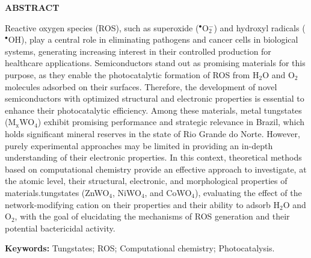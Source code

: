 \ifincluirabstract
\clearpage
\begin{center}
  \fontsize{14}{16}\selectfont\textbf{ABSTRACT}
\end{center}
  \begin{text}
  \noindent Reactive oxygen species (ROS), such as superoxide ($^{\bullet}$O$_2^{-}$) and hydroxyl radicals ($^{\bullet}$OH), play a central role in eliminating pathogens and cancer cells in biological systems, generating increasing interest in their controlled production for healthcare applications. Semiconductors stand out as promising materials for this purpose, as they enable the photocatalytic formation of ROS from H$_{\text{2}}$O and O$_{\text{2}}$ molecules adsorbed on their surfaces. Therefore, the development of novel semiconductors with optimized structural and electronic properties is essential to enhance their photocatalytic efficiency. Among these materials, metal tungstates (M$_{\text{x}}$WO$_{\text{4}}$) exhibit promising performance and strategic relevance in Brazil, which holds significant mineral reserves in the state of Rio Grande do Norte. However, purely experimental approaches may be limited in providing an in-depth understanding of their electronic properties. In this context, theoretical methods based on computational chemistry provide an effective approach to investigate, at the atomic level, their structural, electronic, and morphological properties of materials.tungstates (ZnWO$_{\text{4}}$, NiWO$_{\text{4}}$, and CoWO$_{\text{4}}$), evaluating the effect of the network-modifying cation on their properties and their ability to adsorb H$_{\text{2}}$O and O$_{\text{2}}$, with the goal of elucidating the mechanisms of ROS generation and their potential bactericidal activity. 

  \vspace{1em}
  \noindent \textbf{Keywords:} Tungstates; ROS; Computational chemistry; Photocatalysis.
\end{text}
\fi

\ifincluirsumario
\tableofcontents
\fi

\ifincluirlistafiguras
\listoffigures
\fi

\ifincluirlistatabelas

\listoftables
\fi

\ifincluirlistaabreviaturas
\printglossary[type=\acronymtype, title={}]
\fi

